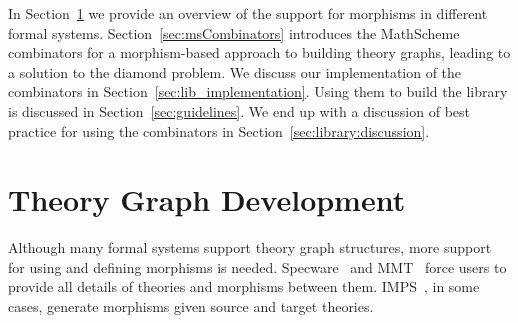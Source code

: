 In Section~\ref{sec:thry_graph_in_action} we provide an overview of the support for morphisms in different formal systems. Section~\ref{sec:msCombinators} introduces the MathScheme combinators for a morphism-based approach to building theory graphs, leading to a solution to the diamond problem. We discuss our implementation of the combinators in Section~\ref{sec:lib_implementation}. Using them to build the library is discussed in Section~\ref{sec:guidelines}. We end up with a discussion of best practice for using the combinators in Section~\ref{sec:library:discussion}. 

\begin{comment}
To test our generation algorithms, we needed a large library of equational theories. As we have discussed in Section~\ref{sec:broader_context}, we work in the favor of a library organized as a theory graph, believing that it leverages the structure of mathematical knowledge. Morphisms of the graph are the means to relating the different theories. In this section, we present our approach to building a library that emphasizes these connections. 

In Section~\ref{sec:thry_based_libs} we discuss the motivation behind building such a library. In Section~\ref{sec:ms_combinators} we present the combinators used in building it and discuss how they are morphism based. Section~\ref{sec:lib_implementation}, discusses the challenges of the implementation of the combinators to build a theory graph. We finally show some interesting cases of library definitions in Section~\ref{sec:interesting_cases}. 
\end{comment}


\section{Theory Graph Development}
\label{sec:thry_graph_in_action}

Although many formal systems support theory graph structures, more support for using and defining morphisms is needed. 
Specware~\cite{Smith99} and MMT~\cite{MMT} force users to provide all details of theories and morphisms between them. IMPS~\cite{farmer1993imps}, in some cases, generate morphisms given source and target theories. 


